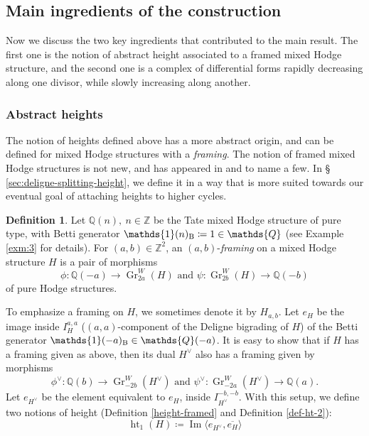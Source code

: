 \documentclass[11pt,a4paper]{amsart}
\newcommand{\Betti}{\text{\rm B}}
\newcommand{\Q}{\mathds{Q}}
\newcommand{\Z}{\mathds{Z}}
\newcommand{\bfone}{{\mathds{1}}}
\DeclareMathOperator {\Gr} {Gr}
\DeclareMathOperator{\im}{Im}
\DeclareMathOperator{\Ht}{ht}
\numberwithin{equation}{section}
\theoremstyle{plain}
\theoremstyle{definition}
\newtheorem*{dfn}{Definition}
\begin{document}
\subsection*{Main ingredients of the construction}
Now we discuss the two key ingredients that contributed to the main
result. The first one is the notion of abstract height associated
to a framed mixed Hodge structure, and the second one is a complex of differential forms rapidly decreasing along one divisor,
while slowly increasing along another. 
\subsubsection*{Abstract heights}
The notion of heights defined above has a more abstract origin, and
can be defined for mixed Hodge structures with a \textit{framing}. The notion of framed mixed Hodge structures is not new, and has appeared
in \cite{BGSV} and \cite{AJ03} to name a few. In \S
\ref{sec:deligne-splitting-height}, we define it in a way that is more
suited towards our eventual goal of attaching heights to higher
cycles. 
\begin{dfn}\label{intro-def-1}
Let $\Q(n),~n\in \Z$ be the Tate mixed Hodge structure of pure type,
with Betti generator $\bfone(n)_{\Betti}\coloneqq 1\in \Q$ (see Example
\ref{exm:3} for details). For $(a,b)\in \Z^{2}$,  an
$(a,b)$-\textit{framing} on a mixed Hodge structure $H$ is a pair 
of morphisms
\begin{displaymath}
  \phi\colon
  \Q(-a)\rightarrow \Gr^{W}_{2a}(H)\text{ and }
  \psi\colon \Gr^{W}_{2b}(H)\rightarrow \Q(-b)
\end{displaymath}
of pure Hodge structures.
\end{dfn}
To emphasize a framing on $H$, we sometimes denote it by
$H_{a,b}$. Let $e_{H}$ be the image inside $I^{a,a}_{H}$
($(a,a)$-component of the Deligne bigrading of $H$) of the Betti
generator $\bfone(-a)_{\Betti}\in \Q(-a)$. It is easy to show that if $H$ has a
framing given as above, then its dual $H^{\vee}$ also has a framing
given by morphisms
\begin{displaymath}
  \phi^{\vee}\colon
  \Q(b)\rightarrow \Gr^{W}_{-2b}(H^{\vee})\text{ and }
  \psi^{\vee}\colon \Gr^{W}_{-2a}(H^{\vee})\rightarrow \Q(a).
\end{displaymath}
Let $e_{H^{\vee}}$ be the element equivalent to $e_{H}$, inside
$I^{-b,-b}_{H^{\vee}}$. With this setup, we define two notions of
height (Definition \ref{height-framed} and Definition \ref{def-ht-2}): 
\begin{displaymath}
\Ht_{1}(H)\coloneqq\im\langle e_{H^{\vee}}, \overline{e_{H}}\rangle
\end{displaymath}
\end{document}

